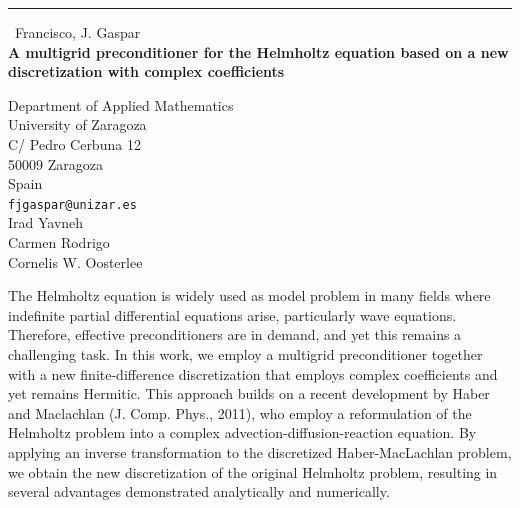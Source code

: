 \documentclass{report}
\begin{document}
\begin{center}
\rule{6in}{1pt} \
{\large Francisco, J. Gaspar \\
{\bf A multigrid preconditioner for the Helmholtz equation based on a new discretization with complex coefficients}}

Department of Applied Mathematics \\ University of Zaragoza \\ C/ Pedro Cerbuna 12 \\ 50009 Zaragoza \\ Spain
\\
{\tt fjgaspar@unizar.es}\\
Irad Yavneh\\
Carmen Rodrigo\\
Cornelis W. Oosterlee\end{center}

The Helmholtz equation is widely used as model problem in many fields
where indefinite partial differential equations arise, particularly wave
equations. Therefore, effective preconditioners are in demand, and yet
this remains a challenging task. In this work, we employ a multigrid
preconditioner together with a new finite-difference discretization that
employs complex coefficients and yet remains Hermitic. This approach
builds on a recent development by Haber and Maclachlan (J. Comp. Phys.,
2011), who employ a reformulation of the Helmholtz problem into a complex
advection-diffusion-reaction equation. By applying an inverse
transformation to the discretized Haber-MacLachlan problem, we obtain the
new discretization of the original Helmholtz problem, resulting in
several advantages demonstrated analytically and numerically.
\end{document}
